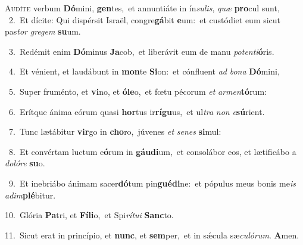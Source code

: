 \lettrine{\initial\textcolor{\initialcolor}{A}}{udíte} verbum \textbf{Dó}\-mini, \textbf{gen}\-tes,~\star et annuntiáte in ín\-\textit{su}\-\textit{lis}, \textit{quæ} \textbf{pro}\-cul sunt,\\
{\numbfont\textcolor{\numbcolor}{~2.}}~Et dícite: Qui dispérsit Israël, congre\-\textbf{gá}\-bit \textbf{e}\-um:~\star et custódiet eum sicut pas\textit{tor} \textit{gre}\-\textit{gem} \textbf{su}\-um.\par
{\numbfont\textcolor{\numbcolor}{~3.}}~Redémit enim \textbf{Dó}\-minus \textbf{Ja}\-cob,~\star et liberávit eum de manu \textit{pot}\-\textit{en}\textit{ti}\textbf{ó}ris.\par
{\numbfont\textcolor{\numbcolor}{~4.}}~Et vénient, et laudábunt in \textbf{mon}\-te \textbf{Si}\-on:~\star et cónfluent \textit{ad} \textit{bo}\-\textit{na} \textbf{Dó}\-mini,\par
{\numbfont\textcolor{\numbcolor}{~5.}}~Super fruménto, et \textbf{vi}\-no, et \textbf{ó}\-\textbf{le}o,~\star et fœtu pécorum \textit{et} \textit{ar}\-\textit{men}\textbf{tó}rum:\par
{\numbfont\textcolor{\numbcolor}{~6.}}~Erítque ánima eórum quasi \textbf{hor}\-tus ir\-\textbf{rí}\-\textbf{gu}us,~\star et ul\textit{tra} \textit{non} \textit{e}\-\textbf{sú}rient.\par
{\numbfont\textcolor{\numbcolor}{~7.}}~Tunc lætábitur \textbf{vir}\-go in \textbf{cho}\-ro,~\star júvenes \textit{et} \textit{se}\-\textit{nes} \textbf{si}\-mul:\par
{\numbfont\textcolor{\numbcolor}{~8.}}~Et convértam luctum e\-\textbf{ó}\-rum in \textbf{gáu}\-\textbf{di}um,~\star et consolábor eos, et lætificábo a \textit{do}\-\textit{ló}\textit{re} \textbf{su}\-o.\par
{\numbfont\textcolor{\numbcolor}{~9.}}~Et inebriábo ánimam sacer\-\textbf{dó}\-tum pin\-\textbf{gué}\-\textbf{di}ne:~\star et pópulus meus bonis me\textit{is} \textit{ad}\-\textit{im}\textbf{plé}bitur.\par
{\numbfont\textcolor{\numbcolor}{10.}}~Glória \textbf{Pa}\-tri, et \textbf{Fí}\-\textbf{li}o,~\star et Spi\-\textit{rí}\-\textit{tu}\textit{i} \textbf{Sanc}\-to.\par
{\numbfont\textcolor{\numbcolor}{11.}}~Sicut erat in princípio, et \textbf{nunc}\-, et \textbf{sem}\-per,~\star et in sǽcula sæ\-\textit{cu}\-\textit{ló}\textit{rum}. \textbf{A}\-men.\par
